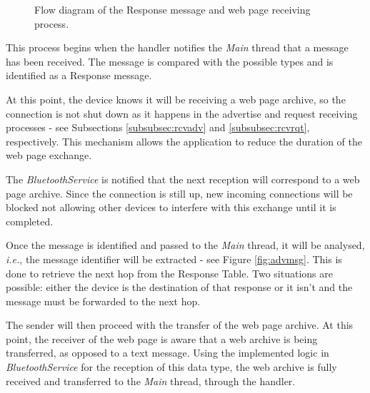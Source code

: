 \begin{figure}[ht]
	\noindent{}
	\caption{\label{fig:rsprcvflux} Flow diagram of the Response message and web page receiving process.}
\end{figure}

This process begins when the handler notifies the \textit{Main} thread that a message has been received. The message is compared with the possible types and is identified as a Response message.

At this point, the device knows it will be receiving a web page archive, so the connection is not shut down as it happens in the advertise and request receiving processes - see Subsections \ref{subsubsec:rcvadv} and \ref{subsubsec:rcvrqt}, respectively. This mechanism allows the application to reduce the duration of the web page exchange.

The \textit{BluetoothService} is notified that the next reception will correspond to a web page archive. Since the connection is still up, new incoming connections will be blocked not allowing other devices to interfere with this exchange until it is completed.

Once the message is identified and passed to the \textit{Main} thread, it will be analysed, \textit{i.e.}, the message identifier will be extracted - see Figure \ref{fig:advmsg}. This is done to retrieve the next hop from the Response Table. Two situations are possible: either the device is the destination of that response or it isn't and the message must be forwarded to the next hop.

The sender will then proceed with the transfer of the web page archive. At this point, the receiver of the web page is aware that a web archive is being transferred, as opposed to a text message. Using the implemented logic in \textit{BluetoothService} for the reception of this data type, the web archive is fully received and transferred to the \textit{Main} thread, through the handler.

